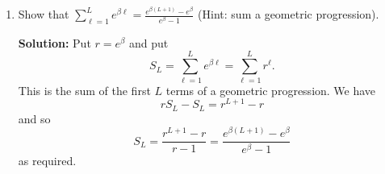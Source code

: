 \documentclass[11pt,a4paper]{book}
\theoremstyle{plain}
\numberwithin{equation}{section}
\newcommand{\vtick}[1]{\draw (#1,-0.075) -- (#1,0.075) }
\newcommand{\htick}[1]{\draw (-0.075,#1) -- (0.075,#1)}
\newenvironment{solution}{\begin{footnotesize}\textbf{Solution:}}{\end{footnotesize}}
\newenvironment{excersizelist}{%
  \renewcommand*{\theenumi}{\thechapter.\arabic{enumi}}%
  \newcommand\itemadvanced{\stepcounter{enumi}\item[$\ast$\, \theenumi.]}
  \begin{enumerate}
}{%
  \end{enumerate}
}
\begin{document}
\begin{excersizelist}
\begin{solution}
\begin{center}
\newcommand{\hgamma}[1]{\draw[smooth,color=black,thick,dashed,domain=-1+(1.0/#1):1,samples=40] plot function{-(#1/pi)*(cos(pi*(x-(1.0/#1)))-cos(pi*x)) };}
\end{center}

\end{solution}

\item \label{excer:sumgeomeebeta} Show that $\sum_{\ell = 1}^L e^{\beta \ell} = \frac{e^{\beta (L+1)} - e^\beta}{e^\beta - 1}$  (Hint: sum a geometric progression).
\begin{solution}
Put $r = e^\beta$ and put
\[
S_L = \sum_{\ell = 1}^L e^{\beta \ell} = \sum_{\ell = 1}^L r^\ell.
\]
This is the sum of the first $L$ terms of a geometric progression.  We have
\[
r S_L - S_L = r^{L+1} - r
\]
and so
\[
S_L = \frac{r^{L+1} - r}{r - 1} =  \frac{e^{\beta (L+1)} - e^\beta}{e^\beta - 1}
\]
as required.
\end{solution}



\end{excersizelist}
\end{document}
